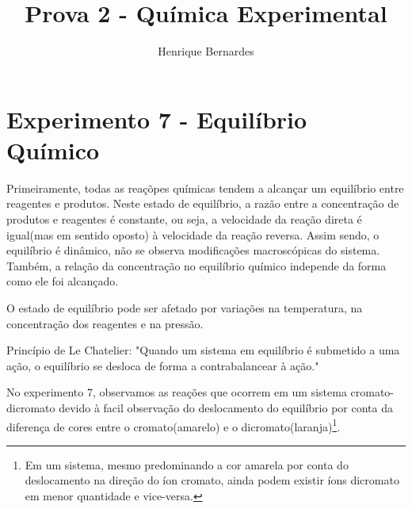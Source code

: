 \documentclass{article}
\begin{document}
\newcommand{\makeboxlabel}[1]{\fbox{#1.}\hfill}%
\newenvironment{boxlabel}
  {\begin{list}
    {\arabic{boxlblcounter}}
    {\usecounter{boxlblcounter}
     \setlength{\labelwidth}{3em}
     \setlength{\labelsep}{0em}
     \setlength{\itemsep}{2pt}
     \setlength{\leftmargin}{1.5cm}
     \setlength{\rightmargin}{2cm}
     \setlength{\itemindent}{0em} 
     \let\makelabel=\makeboxlabel
    }
  }
{\end{list}}

\newenvironment{boxedd}
    {
     \begin{center}
    \begin{tabular}{|p{1\textwidth}|}
    \hline
    }
    { 
    \\\hline
    \end{tabular} 
    \end{center}
    }




\title{Prova 2 - Química Experimental}
\author{Henrique Bernardes}
\maketitle
\thispagestyle{empty}
\section{Experimento 7 - Equilíbrio Químico}
Primeiramente, todas as reaçõpes químicas tendem a alcançar um equilíbrio entre reagentes e produtos. Neste estado de equilíbrio, a razão entre a concentração de produtos e reagentes é constante, ou seja, a velocidade da reação direta é igual(mas em sentido oposto)  à velocidade da reação reversa.
Assim sendo, o equilíbrio é dinâmico, não se observa modificações macroscópicas do sistema.
Também, a relação da concentração no equilíbrio químico independe da forma como ele foi alcançado.

O estado de equilíbrio pode ser afetado por variações na temperatura, na concentração dos reagentes e na pressão.

Princípio de Le Chatelier: "Quando um sistema em equilíbrio é submetido a uma ação, o equilíbrio se desloca de forma a contrabalancear à ação."

No experimento 7, observamos as reações que ocorrem em um sistema cromato-dicromato devido à facil observação do deslocamento do equilíbrio por conta da diferença de cores entre o cromato(amarelo) e o dicromato(laranja)\footnote{Em um sistema, mesmo predominando a cor amarela por conta do deslocamento na direção do íon cromato, ainda podem existir íons dicromato em menor quantidade e vice-versa.}.
\end{document}
